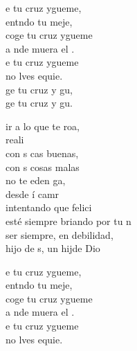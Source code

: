 \documentclass[12pt]{article}
\begin{document}
\begin{multicols*}{2}
\begin{cancion}%
	\begin{chorus}%
	e tu cruz ygueme,  \\
	entndo tu meje, \\
	coge tu cruz ygueme  \\
	a nde muera el . \\
	e tu cruz ygueme  \\
	no lves equie. \\
	ge tu cruz y gu, \\
	ge tu cruz y gu. \\
	\end{chorus}%
	ir a lo que te roa, \\
	 reali \\
	con s cas buenas, \\
	con s cosas malas \\
	no te eden ga, \\
	desde í camr \\
	intentando que  felici \\
	esté siempre briando por tu n  \\
	 ser siempre, en debilidad, \\
	 hijo de s, un hijde Dio\\
	\begin{chorus}%
	e tu cruz ygueme,  \\
	entndo tu meje, \\
	coge tu cruz ygueme  \\
	a nde muera el . \\
	e tu cruz ygueme  \\
	no lves equie. \\

\end{chorus}
\end{cancion}
\end{multicols*}
\end{document}
